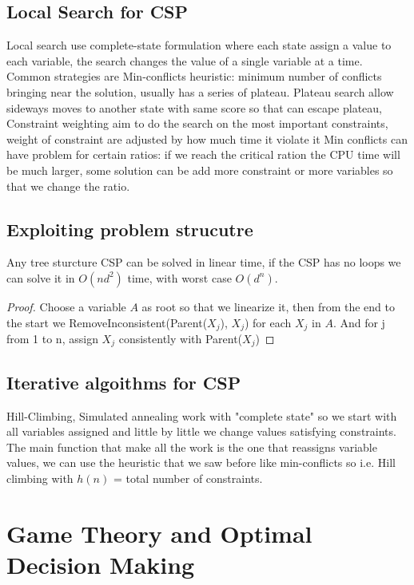 \documentclass[12pt]{book}
\begin{document}
\subsection{Local Search for CSP}
Local search use complete-state formulation where each state assign a value to each variable, the search changes the value of a single variable at a time.
\newline
Common strategies are Min-conflicts heuristic: minimum number of conflicts bringing near the solution, usually has a series of plateau. Plateau search allow sideways moves to another state with same score so that can escape plateau, Constraint weighting aim to do the search on the most important constraints, weight of constraint are adjusted by how much time it violate it
\newline
Min conflicts can have problem for certain ratios: if we reach the critical ration the CPU time will be much larger, some solution can be add more constraint or more variables so that we change the ratio.

\subsection{Exploiting problem strucutre}
Any tree sturcture CSP can be solved in linear time, if the CSP has no loops we can solve it in $O(nd^2)$ time, with worst case $O(d^n)$.
\newline
\begin{proof}
	Choose a variable $A$ as root so that we linearize it, then from the end to the start we RemoveInconsistent(Parent($X_j$), $X_j$) for each $X_j$ in $A$. And for j from 1 to n, assign $X_j$ consistently with Parent($X_j$)
\end{proof}

\subsection{Iterative algoithms for CSP}
Hill-Climbing, Simulated annealing work with "complete state" so we start with all variables assigned and little by little we change values satisfying constraints. The main function that make all the work is the one that reassigns variable values, we can use the heuristic that we saw before like min-conflicts so i.e. Hill climbing with $h(n)$ = total number of constraints.

\section{Game Theory and Optimal Decision Making}
\end{document}
